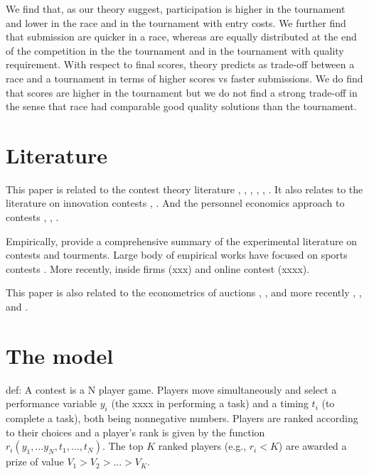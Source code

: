 \documentclass[12pt,]{article}
\begin{document}
We find that, as our theory suggest, participation is higher in the
tournament and lower in the race and in the tournament with entry costs.
We further find that submission are quicker in a race, whereas are
equally distributed at the end of the competition in the the tournament
and in the tournament with quality requirement. With respect to final
scores, theory predicts as trade-off between a race and a tournament in
terms of higher scores vs faster submissions. We do find that scores are
higher in the tournament but we do not find a strong trade-off in the
sense that race had comparable good quality solutions than the
tournament.

\section{Literature}\label{literature}

This paper is related to the contest theory literature
\citet{dixit1987strategic} \citet{baye2003strategic},
\citet{parreiras2010contests}, \citet{moldovanu2001optimal},
\citet{moldovanu2006contest}, \citet{siegel2009all},
\citet{siegel2014contests}. It also relates to the literature on
innovation contests \citet{taylor1995digging}, \citet{che2003optimal}.
And the personnel economics approach to contests \citet{lazear1981rank},
\citet{green1983comparison}, \citet{mary1984economic}.

Empirically, \citet{dechenaux2014survey} provide a comprehensive summary
of the experimental literature on contests and tourments. Large body of
empirical works have focused on sports contests
\citet{szymanski2003economic}. More recently, inside firms (xxx) and
online contest (xxxx).

This paper is also related to the econometrics of auctions
\citet{paarsch1992deciding}, \citet{laffont1995econometrics},
\citet{donald1996identification} and more recently
\citet{athey2011comparing}, \citet{athey2002identification}, and
\citet{athey2007nonparametric}.

\section{The model}\label{the-model}

def: A contest is a N player game. Players move simultaneously and
select a performance variable \(y_i\) (the xxxx in performing a task)
and a timing \(t_i\) (to complete a task), both being nonnegative
numbers. Players are ranked according to their choices and a player's
rank is given by the function \(r_i(y_1,...y_N, t_1, ..., t_N)\). The
top \(K\) ranked players (e.g., \(r_i<K\)) are awarded a prize of value
\(V_1 > V_2 > ... > V_K\).
\end{document}
